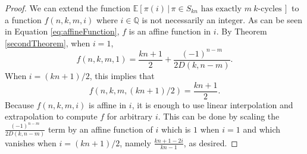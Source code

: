 \begin{proof}
  We can extend the function
  $\mathbb{E}[\pi(i)\, |\, \pi \in S_{kn} \text{ has exactly } m\ k \text{-cycles}\,]$
  to a function $f(n,k,m,i)$ where $i \in \mathbb Q$ is not necessarily an integer.
  As can be seen in Equation \eqref{eq:affineFunction}, $f$ is an affine function in $i$.
  By Theorem \ref{secondTheorem}, when $i = 1$, \begin{equation}
    f(n,k,m,1) =
    \frac{kn + 1}{2} + \frac{(-1)^{n-m}}{2 D(k, n - m)}.
  \end{equation}
  When $i = (kn+1)/2$, this implies that \begin{equation}
    f(n,k,m,(kn+1)/2) = \frac{kn+1}{2}.
  \end{equation}
  Because $f(n,k,m,i)$ is affine in $i$, it is enough to use linear
  interpolation and extrapolation to compute $f$ for arbitrary $i$.
  This can be done by scaling the
  $\displaystyle \frac{(-1)^{n-m}}{2 D(k, n - m)}$ term
  by an affine function of $i$ which is $1$ when $i=1$ and which vanishes
  when $i = (kn+1)/2$, namely $\displaystyle \frac{kn + 1 - 2i}{kn - 1}$, as
  desired.
\end{proof}

